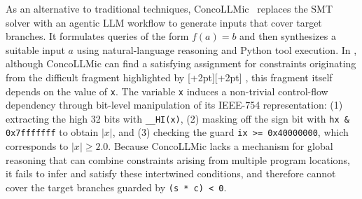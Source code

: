 \documentclass[acmsmall]{acmart}
\newcommand{\gordianhighlight}[2]{%
  \begingroup
  \setlength{\fboxsep}{0pt}%
  \colorbox{#1}{\kern1pt\raisebox{0pt}[\dimexpr\height+2pt\relax][\dimexpr\depth+2pt\relax]{#2}\kern1pt}%
  \endgroup
}
\newcommand{\hly}[1]{\gordianhighlight{yellow!50}{#1}}
\theoremstyle{definition}
\begin{document}
As an alternative to traditional techniques, ConcoLLMic~\cite{concollmic} replaces the SMT solver with an agentic LLM workflow to generate inputs that cover target branches. It formulates queries of the form $f(a) = b$ and then  synthesizes a suitable input $a$ using natural-language reasoning and Python tool execution. In , although ConcoLLMic can find a satisfying assignment for constraints originating from the difficult fragment highlighted by \hly{\phantom{X}}, this fragment itself depends on the value of \lstinline[style=PaperCode]|x|. The variable \lstinline[style=PaperCode]|x| induces a non-trivial control-flow dependency through bit-level manipulation of its IEEE-754 representation: (1) extracting the high 32 bits with \lstinline[style=PaperCode]|__HI(x)|, (2) masking off the sign bit with \lstinline[style=PaperCode]|hx & 0x7fffffff| to obtain $|x|$, and (3) checking the guard \lstinline[style=PaperCode]|ix >= 0x40000000|, which corresponds to $|x| \ge 2.0$. Because ConcoLLMic lacks a mechanism for global reasoning that can combine constraints arising from multiple program locations, it fails to infer and satisfy these intertwined conditions, and therefore cannot cover the target branches guarded by \lstinline[style=PaperCode]|(s * c) < 0|.
\end{document}
